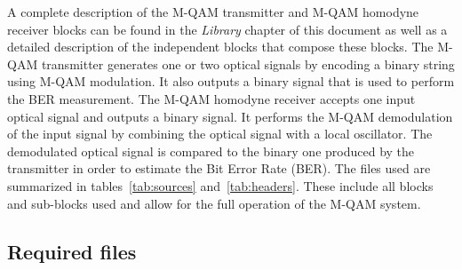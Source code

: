\begin{refsection}
A complete description of the M-QAM transmitter and M-QAM homodyne receiver
blocks can be found in the \textit{Library} chapter of this document as well as
a detailed description of the independent blocks that compose these blocks.
The M-QAM transmitter generates one or two optical signals by encoding a binary
string using M-QAM modulation. It also outputs a binary signal that is used to
perform the BER measurement.
The M-QAM homodyne receiver accepts one input optical signal and outputs
a binary signal. It performs the M-QAM demodulation of the input signal by
combining the optical signal with a local oscillator.
The demodulated optical signal is compared to the binary one produced by the
transmitter in order to estimate the Bit Error Rate (BER).
The files used are summarized in tables~\ref{tab:sources} and~\ref{tab:headers}.
These include all blocks and sub-blocks used and allow for the full operation of
the M-QAM system.

\subsection*{Required files}\label{RequiredFilesMQAM}


\end{refsection}
